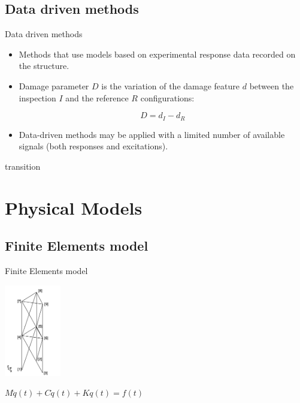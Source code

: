 \documentclass{beamer}
\begin{document}
\subsection{Data driven methods}
\begin{frame}{Data driven methods}
\begin{center}
\begin{itemize}
\item Methods that use models based on experimental response data recorded on the structure.

\vspace{1\baselineskip}
\item Damage parameter $D$ is the variation of the damage feature $d$ between
the inspection $I$ and the reference $R$ configurations:

\begin{equation}
D=d_{I} - d_{R}
\end{equation}
\item Data-driven methods may be applied with a limited number of available signals (both
responses and excitations).
\end{itemize}
\end{center}


\end{frame}


\begin{frame}{transition}
\end{frame}


\section{Physical Models}

\subsection{Finite Elements model}
\begin{frame}{Finite Elements model}

\begin{center}
\includegraphics[height=4cm]{images/finite_element.png}

$M \ddot{q}(t) + C \dot{q}(t) + K q(t) = f(t)$
\end{center}

\end{frame}
\end{document}

